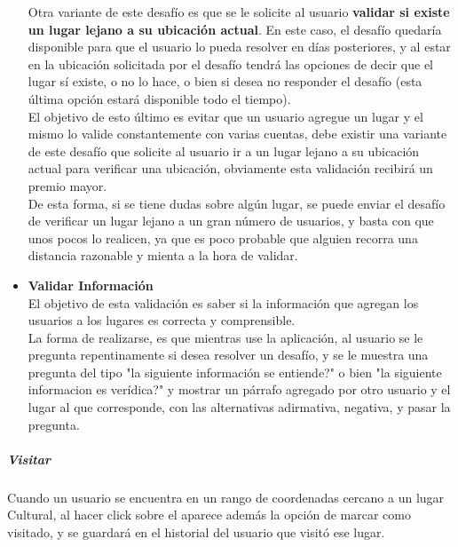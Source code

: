 \documentclass[10pt,letterpaper]{article}
\begin{document}
\begin{itemize}
Otra variante de este desafío es que se le solicite al usuario \textbf{validar si existe un lugar lejano a su ubicación actual}. En este caso, el desafío quedaría disponible para que el usuario lo pueda resolver en días posteriores, y al estar en la ubicación solicitada por el desafío tendrá las opciones de decir que el lugar sí existe, o no lo hace, o bien si desea no responder el desafío (esta última opción estará disponible todo el tiempo).\\

El objetivo de esto último es evitar que un usuario agregue un lugar y el mismo lo valide constantemente con varias cuentas, debe existir una variante de este desafío que solicite al usuario ir a un lugar lejano a su ubicación actual para verificar una ubicación, obviamente esta validación recibirá un premio mayor.\\

De esta forma, si se tiene dudas sobre algún lugar, se puede enviar el desafío de verificar un lugar lejano a un gran número de usuarios, y basta con que unos pocos lo realicen, ya que es poco probable que alguien recorra una distancia  razonable y mienta a la hora de validar.\\

 \item \textbf{Validar Información} \\

El objetivo de esta validación es saber si la información que agregan los usuarios a los lugares es correcta y comprensible.\\

La forma de realizarse, es que mientras use la aplicación, al usuario se le pregunta repentinamente si desea resolver un desafío, y se le muestra una pregunta del tipo "la siguiente información se entiende?" o bien "la siguiente informacion es verídica?" y mostrar un párrafo agregado por otro usuario y el lugar al que corresponde, con las alternativas adirmativa, negativa, y pasar la pregunta.\\

\end{itemize}

\subparagraph{Visitar}

Cuando un usuario se encuentra en un rango de coordenadas cercano a un lugar Cultural, al hacer click sobre el aparece además la opción de marcar como visitado, y se guardará en el historial del usuario que visitó ese lugar.\\
\end{document}
